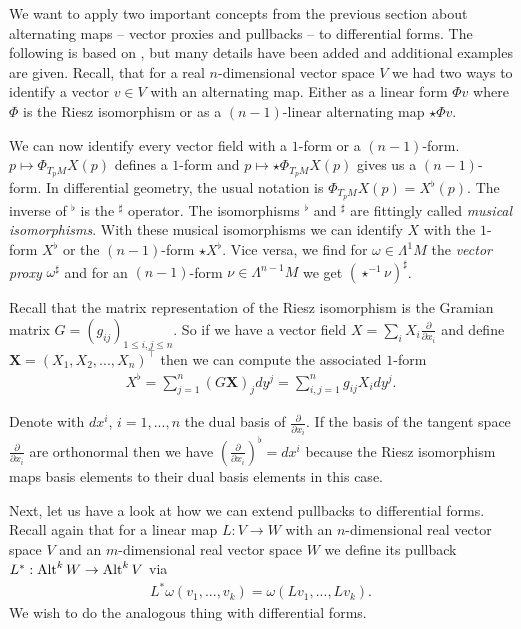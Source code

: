 \documentclass[../master_thesis.tex]{subfiles}
\begin{document}
We want to apply two important concepts from the previous section about 
alternating maps -- vector proxies and pullbacks -- to differential forms.
The following is based on \cite[Ch.\,6]{arnold}, 
but many details have been
added and additional examples are given.
Recall, that for a real $n$-dimensional vector space $V$ we had two 
ways to identify a vector $v\in V$ with an alternating map. Either as a 
linear form $\Phi v$ where $\Phi$ is the Riesz isomorphism or as a 
$(n-1)$-linear alternating map $\star \Phi v$. 

We can now identify every vector field with a $1$-form or 
a $(n-1)$-form. $p \mapsto \Phi_{T_p M} X(p)$ defines a $1$-form and  
$p \mapsto \star \Phi_{T_p M} X(p)$ gives us a $(n-1)$-form. In differential 
geometry, the usual notation is
$\Phi_{T_p M} X(p) = X^\flat(p)$. The inverse of $^\flat$ is the $^\sharp$ operator.
The isomorphisms $^\flat$ and $^\sharp$ 
are fittingly called \textit{musical isomorphisms}. 
With these musical isomorphisms we can identify $X$ with the $1$-form 
$X^\flat$ or the $(n-1)$-form $\star X^\flat$. Vice versa, we find 
for $\omega \in \Lambda^1 M$ the \textit{vector proxy} $\omega ^\sharp$ and for 
an $(n-1)$-form $\nu \in \Lambda^{n-1} M$ we get $(\star^{-1} \nu)^\sharp$.

Recall that the matrix representation of the Riesz isomorphism is the 
Gramian matrix $G = (g_{ij})_{1\leq i,j \leq n} $. So if we have a vector field 
$X = \sum_i X_i \frac{\partial}{\partial x_i}$ and define 
$\mathbf{X} = (X_1, X_2, ..., X_n)^\top$ then we can compute the 
associated $1$-form 
\begin{align*}
    X^\flat = \sum_{j=1}^n (G \mathbf{X})_j dy^j 
    = \sum_{i,j=1}^n g_{ij} X_i dy^j.
\end{align*}

Denote with $dx^i$, $i=1, ..., n$ the dual basis of 
$\frac{\partial}{\partial x_i}$.
If the basis of the tangent space $\frac{\partial}{\partial x_i}$ are 
orthonormal then we have $(\frac{\partial}{\partial x_i})^\flat = dx^i$ 
because the Riesz isomorphism maps basis elements to their dual basis elements
in this case.

Next, let us have a look at how we can extend pullbacks to differential forms.
Recall again that for a linear map $L: V \rightarrow W$ with an 
$n$-dimensional real vector space $V$ and an 
$m$-dimensional real vector space $W$ we define its pullback 
$L^*: {\text{Alt}^{k}\,W} \rightarrow {\text{Alt}^{k}\,V}$ via 
\begin{align*}
    L^*\omega (v_1, ..., v_k) = \omega (Lv_1, ..., L v_k).
\end{align*} 
We wish to do the analogous thing with differential forms. 
\end{document}

